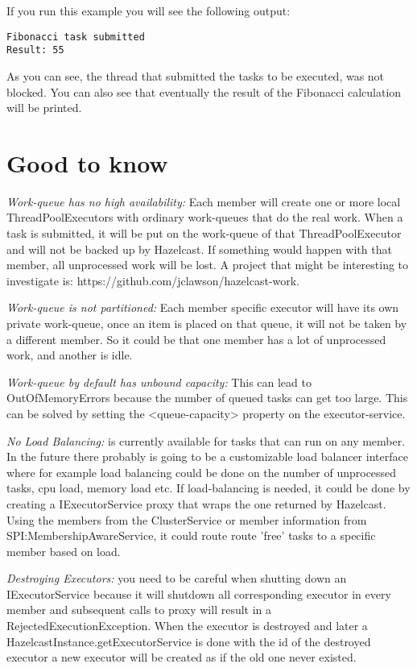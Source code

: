 If you run this example you will see the following output:
\begin{lstlisting}
Fibonacci task submitted
Result: 55
\end{lstlisting}
As you can see, the thread that submitted the tasks to be executed, was not blocked. You can also see that eventually the result of the Fibonacci calculation will be printed. 

\section{Good to know}

\emph{Work-queue has no high availability:} Each member will create one or more local ThreadPoolExecutors with ordinary work-queues that do the real work. When a task is submitted, it will be put on the work-queue of that ThreadPoolExecutor and will not be backed up by Hazelcast. If something would happen with that member, all unprocessed work will be lost. A project that might be interesting to investigate is: https://github.com/jclawson/hazelcast-work.

\emph{Work-queue is not partitioned:} Each member specific executor will have its own private work-queue, once an item is placed on that queue, it will not be taken by a different member. So it could be that one member has a lot of unprocessed work, and another is idle.

\emph{Work-queue by default has unbound capacity:} This can lead to OutOfMemoryErrors because the number of queued tasks can get too large. This can be solved by setting the <queue-capacity> property on the executor-service.

\emph{No Load Balancing:} is currently available for tasks that can run on any member. In the future there probably is going to be a customizable load balancer interface where for example load balancing could be done on the number of unprocessed tasks, cpu load, memory load etc. If load-balancing is needed, it could be done by creating a IExecutorService proxy that wraps the one returned by Hazelcast. Using the members from the ClusterService or  member information from SPI:MembershipAwareService, it could route route 'free' tasks to a specific member based on load.

\emph{Destroying Executors:} you need to be careful when shutting down an IExecutorService because it will shutdown all corresponding executor in every member and subsequent calls to proxy will result in a RejectedExecutionException. When the executor is destroyed and later a HazelcastInstance.getExecutorService is done with the id of the destroyed executor a new executor will be created as if the old one never existed.

